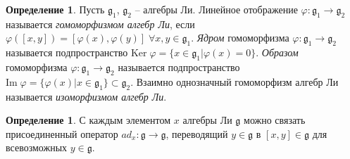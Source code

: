 \documentclass[12pt]{article}
\theoremstyle{definition}
\newtheorem{defin}[theorem]{Определение}
\begin{document}
\begin{defin}
Пусть $\mathfrak{g}_1$, $\mathfrak{g}_2$ -- алгебры Ли. Линейное отображение $\varphi:\mathfrak{g}_1 \rightarrow \mathfrak{g}_2$ называется \textit{гомоморфизмом алгебр Ли}, если $\varphi([x, y]) = [\varphi(x), \varphi(y)]\;\forall x,y\in\mathfrak{g}_1$. \textit{Ядром} гомоморфизма $\varphi:\mathfrak{g}_1 \rightarrow \mathfrak{g}_2$ называется подпространство $\text{Ker}\;\varphi = \{x \in\mathfrak{g}_1| \varphi(x) = 0\}$. \textit{Образом} гомоморфизма $\varphi: \mathfrak{g}_1 \rightarrow \mathfrak{g}_2$ называется подпространство $\text{Im}\;\varphi = \{\varphi(x)| x\in \mathfrak{g}_1\}\subset\mathfrak{g}_2$. Взаимно однозначный гомоморфизм алгебр Ли называется \textit{изоморфизмом алгебр Ли}.
\end{defin}
\begin{defin}
С каждым элементом $x$ алгебры Ли $\mathfrak{g}$ можно связать присоединенный оператор $ad_x:\mathfrak{g}\rightarrow\mathfrak{g}$, переводящий $y\in\mathfrak{g}$ в $[x, y]\in \mathfrak{g}$ для всевозможных $y \in \mathfrak{g}$.
\end{defin}
\end{document}
